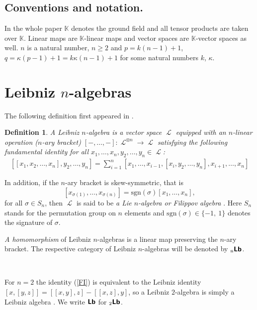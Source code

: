 \documentclass[12pt, reqno]{amsart}
\newtheorem{definition}{Definition}[section]
\def\Lb{\operatorname{\textbf{\textsf{Lb}}}}
\def\nLb{\operatorname{{}_{n}\textbf{\textsf{Lb}}}}
\def\ele{\operatorname{\mathcal{L}}}
\begin{document}
\subsection*{Conventions and notation.} In the whole paper $\mathbb{K}$ denotes the ground field and all tensor products are taken over $\mathbb{K}$. Linear maps are $\mathbb{K}$-linear maps and vector spaces are $\mathbb{K}$-vector spaces as well.  $n$ is a natural number, $n\geq 2$ and $p=k(n-1)+1$, $q=\kappa(p-1)+1=k\kappa(n-1)+1$ for some natural numbers $k$, $\kappa$.


\section{Leibniz $n$-algebras}



The following definition first appeared in \cite{CLP}.

\begin{definition}  A Leibniz $n$-algebra  is a vector space ${\ele}$
equipped with an $n$-linear operation ($n$-ary bracket) $[-, \dots,-] : {\ele}^{\otimes n} \to {\ele}$  satisfying the following fundamental identity for all $x_1, \dots, x_n, y_2, \dots, y_n \in {\ele}$:
\begin{equation} \label{FI}
\begin{array}{l}
[[x_1, x_2, \dots, x_n],y_2,\dots,y_{n}] =
  \displaystyle \sum_{i=1}^n [x_1,\dots, x_{i-1}, [ x_i,y_2,\dots,
y_{n}],x_{i+1},\dots,x_n]
\end{array}
\end{equation}
\end{definition}

In addition, if the $n$-ary bracket is skew-symmetric, that is
\[
[x_{\sigma(1)}, \dots, x_{\sigma(n)}] = {\text{sgn}(\sigma)} [x_1, \dots, x_n],
\]
 for all $\sigma \in S_n$, then ${\ele}$ is said to be \emph{a  Lie $n$-algebra or Filippov algebra } \cite{Fi, Na}. Here $S_n$ stands for the permutation group on $n$ elements and $\text{sgn}(\sigma)\in \{-1,\ 1\}$ denotes the
signature of $\sigma$.


\emph{A homomorphism} of Leibniz $n$-algebras is a linear map preserving the $n$-ary bracket. The respective category of Leibniz $n$-algebras will be denoted by $\nLb$.

\

For $n=2$ the identity (\ref{FI}) is equivalent to the Leibniz identity  $[x,[y,z]] = [[x,y],z] - [[x,z],y]$, so a Leibniz $2$-algebra is simply a Leibniz algebra \cite{Lo}. We write $\Lb$ for $_2{\Lb}$.
\end{document}
